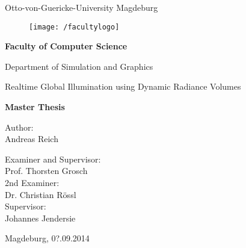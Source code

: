\documentclass[thesis.tex]{subfiles}
\begin{document}
\thispagestyle {empty}

\begin{center}
\begin{Large}
Otto-von-Guericke-University Magdeburg\\

\begin{figure}
	\centering
	\texttt{[image: /facultylogo]}
	\label{fig:logoinffak}
\end{figure}

\vspace{3mm}

\textbf{Faculty of Computer Science}\\
\end{Large}

\vspace{3mm}

Department of Simulation and Graphics\\

\vspace{1cm}
\begin{LARGE}
Realtime Global Illumination using Dynamic Radiance Volumes\\
\end{LARGE}
\vspace{15mm}
{\Huge \textbf{Master Thesis}}\\
\vspace{15mm}

Author:\\
\vspace{4mm}
{\Large Andreas Reich}\\

\vspace{14mm}

Examiner and Supervisor:\\
\vspace{2mm}
{\Large Prof. Thorsten Grosch}\\
\vspace{4mm}
2nd Examiner:\\
\vspace{2mm}
{\Large Dr. Christian Rössl}\\
\vspace{8mm}
Supervisor:\\
\vspace{2mm}
{\Large Johannes Jendersie}\\


\vspace{20mm}

{\large Magdeburg, 0?.09.2014}\\

\vspace{40mm}

\end{center}
\clearpage
\end{document}

